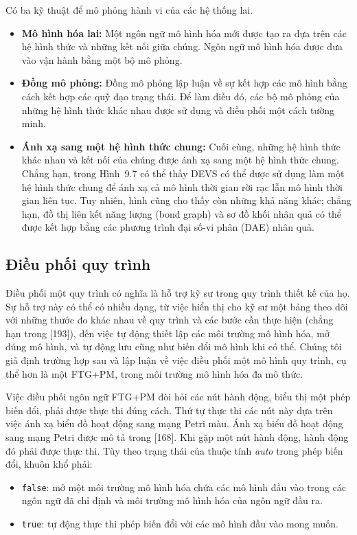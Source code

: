 
Có ba kỹ thuật để mô phỏng hành vi của các hệ thống lai.
\begin{itemize}
\item \textbf{Mô hình hóa lai:} Một ngôn ngữ mô hình hóa mới được tạo ra dựa trên các hệ hình thức và những kết nối giữa chúng. Ngôn ngữ mô hình hóa được đưa vào vận hành bằng một bộ mô phỏng.
\item \textbf{Đồng mô phỏng:} Đồng mô phỏng lập luận về sự kết hợp các mô hình bằng cách kết hợp các quỹ đạo trạng thái. Để làm điều đó, các bộ mô phỏng của những hệ hình thức khác nhau được sử dụng và điều phối một cách tường minh.
\item \textbf{Ánh xạ sang một hệ hình thức chung:} Cuối cùng, những hệ hình thức khác nhau và kết nối của chúng được ánh xạ sang một hệ hình thức chung. Chẳng hạn, trong Hình~9.7 có thể thấy DEVS có thể được sử dụng làm một hệ hình thức chung để ánh xạ cả mô hình thời gian rời rạc lẫn mô hình thời gian liên tục. Tuy nhiên, hình cũng cho thấy còn những khả năng khác; chẳng hạn, đồ thị liên kết năng lượng (bond graph) và sơ đồ khối nhân quả có thể được kết hợp bằng các phương trình đại số-vi phân (DAE) nhân quả.
\end{itemize}

\subsection{Điều phối quy trình}
Điều phối một quy trình có nghĩa là hỗ trợ kỹ sư trong quy trình thiết kế của họ. Sự hỗ trợ này có thể có nhiều dạng, từ việc hiển thị cho kỹ sư một bảng theo dõi với những thước đo khác nhau về quy trình và các bước cần thực hiện (chẳng hạn trong [193]), đến việc tự động thiết lập các môi trường mô hình hóa, mở đúng mô hình, và tự động lưu cũng như biến đổi mô hình khi có thể. Chúng tôi giả định trường hợp sau và lập luận về việc điều phối một mô hình quy trình, cụ thể hơn là một FTG+PM, trong môi trường mô hình hóa đa mô thức.

Việc điều phối ngôn ngữ FTG+PM đòi hỏi các nút hành động, biểu thị một phép biến đổi, phải được thực thi đúng cách. Thứ tự thực thi các nút này dựa trên việc ánh xạ biểu đồ hoạt động sang mạng Petri màu. Ánh xạ biểu đồ hoạt động sang mạng Petri được mô tả trong [168]. Khi gặp một
nút hành động, hành động đó phải được thực thi. Tùy theo trạng thái của thuộc tính \emph{auto} trong phép biến đổi, khuôn khổ phải:
\begin{itemize}
\item \texttt{false}: mở một môi trường mô hình hóa chứa các mô hình đầu vào trong các ngôn ngữ đã chỉ định và môi trường mô hình hóa của ngôn ngữ đầu ra.
\item \texttt{true}: tự động thực thi phép biến đổi với các mô hình đầu vào mong muốn.
\end{itemize}

